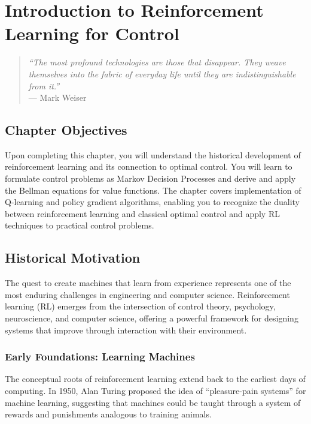
\setcounter{chapter}{23}

\chapter{Introduction to Reinforcement Learning for Control}
\label{ch:rl_control}

\begin{quote}
\textit{``The most profound technologies are those that disappear. They weave themselves into the fabric of everyday life until they are indistinguishable from it.''}\\
--- Mark Weiser
\end{quote}

\section*{Chapter Objectives}
Upon completing this chapter, you will understand the historical development of reinforcement learning and its connection to optimal control. You will learn to formulate control problems as Markov Decision Processes and derive and apply the Bellman equations for value functions. The chapter covers implementation of Q-learning and policy gradient algorithms, enabling you to recognize the duality between reinforcement learning and classical optimal control and apply RL techniques to practical control problems.

\section{Historical Motivation}
\label{sec:rl_history}

The quest to create machines that learn from experience represents one of the most enduring challenges in engineering and computer science. Reinforcement learning (RL) emerges from the intersection of control theory, psychology, neuroscience, and computer science, offering a powerful framework for designing systems that improve through interaction with their environment.

\subsection{Early Foundations: Learning Machines}

The conceptual roots of reinforcement learning extend back to the earliest days of computing. In 1950, Alan Turing proposed the idea of ``pleasure-pain systems'' for machine learning, suggesting that machines could be taught through a system of rewards and punishments analogous to training animals.

